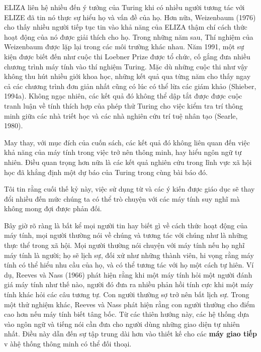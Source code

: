ELIZA liên hệ nhiều đến ý tưởng của Turing khi có nhiều người tương tác với ELIZE đã tin nó thực sự hiểu họ và vấn đề của họ. Hơn nữa, Weizenbaum (1976) cho thấy nhiều người tiếp tục tin vào khả năng của ELIZA thậm chí cách thức hoạt động của nó được giải thích cho họ. Trong những năm sau, Thí nghiệm của Weizenbaum được lặp lại trong các môi trường khác nhau. Năm 1991, một sự kiện được biết đến như cuộc thi Loebner Prize được tổ chức, cố gắng đưa nhiều chương trình máy tính vào thí nghiệm Turing. Mặc dù những cuộc thi như vậy không thu hút nhiều giới khoa học, những kết quả qua từng năm cho thấy ngay cả các chương trình đơn giản nhất cũng có lúc có thể lừa các giám khảo (Shieber, 1994a). Không ngạc nhiên, các kết quả đó không thể dập tắt được được cuộc tranh luận về tính thích hợp của phép thử Turing cho việc kiểm tra trí thông minh giữa các nhà triết học và các nhà nghiên cứu trí tuệ nhân tạo (Searle, 1980).

May thay, với mục đích của cuốn sách, các kết quả đó không liên quan đến việc khả năng của máy tính trong việc trở nên thông minh, hay hiểu ngôn ngữ tự nhiên. Điều quan trọng hơn nữa là các kết quả nghiên cứu trong lĩnh vực xã hội học đã khẳng định một dự báo của Turing trong cùng bài báo đó.

\begin{adjustwidth}{1.5cm}{}
Tôi tin rằng cuối thế kỷ này, việc sử dụng từ và các ý kiến được giáo dục sẽ thay đổi nhiều đến mức chúng ta có thể trò chuyện với các máy tính suy nghĩ mà không mong đợi được phản đối.
\end{adjustwidth}

Bây giờ rõ ràng là bất kể mọi người tin hay biết gì về cách thức hoạt động của máy tính, mọi người thường nói về chúng và tương tác với chúng như là những thực thể trong xã hội. Mọi người thường nói chuyện với máy tính nếu họ nghĩ máy tính là người; họ sẽ lịch sự, đối xử như những thành viên, hi vọng rằng máy tính có thể hiểu nhu cầu của họ, và có thể tương tác với họ một cách tự hiên. Ví dụ, Reeves và Nass (1966) phát hiện rằng khi một máy tính hỏi một người đánh giá máy tính như thế nào, người đó đưa ra nhiều phản hồi tính cực khi một máy tính khác hỏi các câu tương tự. Con người thường sợ trở nên bất lịch sự. Trong một thử nghiệm khác, Reeves và Nass phát hiện rằng con người thường cho điểm cao hơn nếu máy tính biết tâng bốc. Từ các thiên hướng này, các hệ thống dựa vào ngôn ngữ và tiếng nói cần đưa cho người dùng những giao diện tự nhiên nhất. Điều này dẫn đến sự tập trung dài hơn vào thiết kế cho các \textbf{máy giao tiếp} v àhệ thống thông minh có thể đối thoại.

